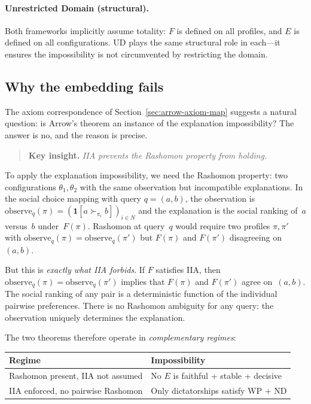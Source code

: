 \paragraph{Unrestricted Domain (structural).}
Both frameworks implicitly assume totality: $F$ is defined on all
profiles, and $E$ is defined on all configurations. UD plays the same
structural role in each---it ensures the impossibility is not
circumvented by restricting the domain.

\subsection{Why the embedding fails}
\label{sec:arrow-embedding-fails}

The axiom correspondence of Section~\ref{sec:arrow-axiom-map}
suggests a natural question: is Arrow's theorem an instance of the
explanation impossibility? The answer is no, and the reason is precise.

\begin{quote}
\textbf{Key insight.}\; \emph{IIA prevents the Rashomon property from
holding.}
\end{quote}

To apply the explanation impossibility, we need the Rashomon property:
two configurations $\theta_1, \theta_2$ with the same observation
but incompatible explanations. In the social choice mapping with
query $q = (a,b)$, the observation is
$\mathrm{observe}_q(\pi) = (\mathbf{1}[a \succ_{\pi_i} b])_{i \in N}$
and the explanation is the social ranking of~$a$ versus~$b$ under~$F(\pi)$.
Rashomon at query~$q$ would require two profiles $\pi, \pi'$ with
$\mathrm{observe}_q(\pi) = \mathrm{observe}_q(\pi')$ but
$F(\pi)$ and $F(\pi')$ disagreeing on~$(a,b)$.

But this is \emph{exactly what IIA forbids}. If $F$ satisfies IIA,
then $\mathrm{observe}_q(\pi) = \mathrm{observe}_q(\pi')$ implies
that $F(\pi)$ and $F(\pi')$ agree on~$(a,b)$. The social ranking
of any pair is a deterministic function of the individual pairwise
preferences. There is no Rashomon ambiguity for any query: the
observation uniquely determines the explanation.

The two theorems therefore operate in \emph{complementary regimes}:

\begin{center}
\renewcommand{\arraystretch}{1.2}
\begin{tabular}{@{}ll@{}}
\toprule
\textbf{Regime} & \textbf{Impossibility} \\
\midrule
Rashomon present, IIA not assumed &
  No $E$ is faithful + stable + decisive \\
IIA enforced, no pairwise Rashomon &
  Only dictatorships satisfy WP + ND \\
\bottomrule
\end{tabular}
\end{center}


